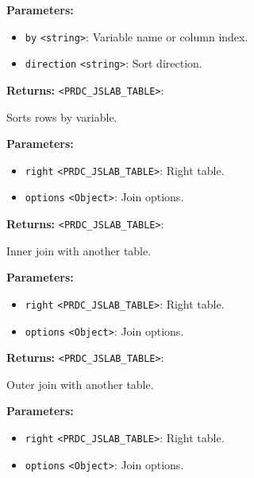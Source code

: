 \documentclass[12pt,a4paper]{article}
\begin{document}
\noindent \textbf{Parameters:}
\begin{itemize}
  \item \texttt{by} \texttt{<string>}: Variable name or column index.
  \item \texttt{direction} \texttt{<string>}: Sort direction.
\end{itemize}

\noindent \textbf{Returns:} \texttt{<PRDC\_JSLAB\_TABLE>}:

\noindent Sorts rows by variable.

\vspace{5mm}
\noindent {}


\noindent \textbf{Parameters:}
\begin{itemize}
  \item \texttt{right} \texttt{<PRDC\_JSLAB\_TABLE>}: Right table.
  \item \texttt{options} \texttt{<Object>}: Join options.
\end{itemize}

\noindent \textbf{Returns:} \texttt{<PRDC\_JSLAB\_TABLE>}:

\noindent Inner join with another table.

\vspace{5mm}
\noindent {}


\noindent \textbf{Parameters:}
\begin{itemize}
  \item \texttt{right} \texttt{<PRDC\_JSLAB\_TABLE>}: Right table.
  \item \texttt{options} \texttt{<Object>}: Join options.
\end{itemize}

\noindent \textbf{Returns:} \texttt{<PRDC\_JSLAB\_TABLE>}:

\noindent Outer join with another table.

\vspace{5mm}
\noindent {}


\noindent \textbf{Parameters:}
\begin{itemize}
  \item \texttt{right} \texttt{<PRDC\_JSLAB\_TABLE>}: Right table.
  \item \texttt{options} \texttt{<Object>}: Join options.
\end{itemize}
\end{document}
